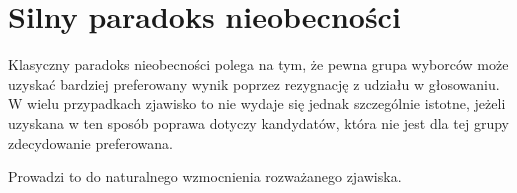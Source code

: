 \documentclass[12pt,a4paper]{mwrep}
\begin{document}

	
	
	
	
	
	
	
	
	
	
	
	
	
	
	
	
	
	\chapter{Silny paradoks nieobecności}
	
	Klasyczny paradoks nieobecności polega na tym, że pewna grupa wyborców może uzyskać bardziej preferowany wynik poprzez rezygnację z udziału w głosowaniu. W wielu przypadkach zjawisko to nie wydaje się jednak szczególnie istotne, jeżeli uzyskana w ten sposób poprawa dotyczy kandydatów, która nie jest dla tej grupy zdecydowanie preferowana.
	
	Prowadzi to do naturalnego wzmocnienia rozważanego zjawiska.
	
\end{document}
